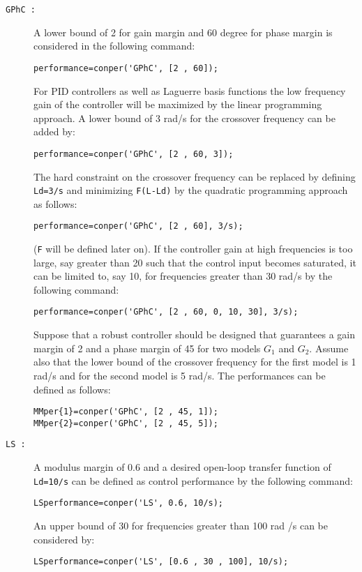 \documentclass [12pt , a4paper] {report}
\begin{document}
\begin{description}

\item[{\tt GPhC :}] A lower bound of 2 for gain margin and 60 degree for phase margin is considered in the following command:
\begin{lstlisting}
performance=conper('GPhC', [2 , 60]);
\end{lstlisting}
For PID controllers as well as Laguerre basis functions the low frequency gain of the controller will be maximized by the linear programming approach. A lower bound of 3 rad/s for the crossover frequency 	can be added by:
\begin{lstlisting}
performance=conper('GPhC', [2 , 60, 3]);
\end{lstlisting}
The hard constraint on the crossover frequency can be replaced by defining {\tt Ld=3/s} and minimizing {\tt F(L-Ld)} by the quadratic programming approach as follows:
\begin{lstlisting}
performance=conper('GPhC', [2 , 60], 3/s);
\end{lstlisting}	
({\tt F} will be defined later on). If the controller gain at high frequencies is too large, say greater than 20 such that the control input becomes saturated, it can be limited to, say 10, for frequencies greater than 30 rad/s by the following command:
\begin{lstlisting}
performance=conper('GPhC', [2 , 60, 0, 10, 30], 3/s);
\end{lstlisting}  
Suppose that a robust controller should be designed that guarantees a gain margin of 2 and a phase margin of 45  for two models $G_1$ and $G_2$. Assume also that the lower bound of the crossover frequency for the first model is 1 rad/s and for the second model is 5 rad/s. The performances can be defined as follows:
\begin{lstlisting}
MMper{1}=conper('GPhC', [2 , 45, 1]);
MMper{2}=conper('GPhC', [2 , 45, 5]);
\end{lstlisting}

\item[{\tt LS :}] A modulus margin of 0.6 and a desired open-loop transfer function of {\tt Ld=10/s} can be defined as control performance by the following command:
\begin{lstlisting}
LSperformance=conper('LS', 0.6, 10/s);
\end{lstlisting}  
An upper bound of 30 for frequencies greater than 100 rad /s can be considered by:
\begin{lstlisting}
LSperformance=conper('LS', [0.6 , 30 , 100], 10/s);
\end{lstlisting} 


\end{description}
\end{document}
